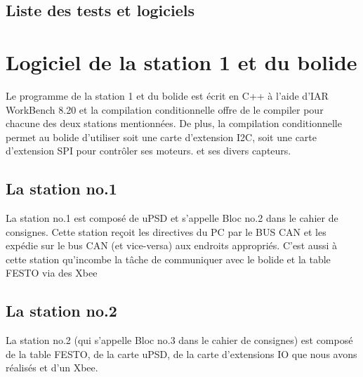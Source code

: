\documentclass[10pt,a4paper,final]{article}
\begin{document}
\begin{spacing}{1.5}
\subsection{Liste des tests et logiciels}






\pagebreak
\section{Logiciel de la station 1 et du bolide}
Le programme de la station 1 et du bolide est écrit en C++ à l'aide d'IAR WorkBench 8.20 et la compilation conditionnelle offre de le compiler pour chacune des deux stations mentionnées. De plus, la compilation conditionnelle permet au bolide d'utiliser soit une carte d'extension I2C, soit une carte d'extension SPI pour contrôler ses moteurs. et ses divers capteurs.

\subsection{La station no.1}
La station no.1 est composé de uPSD et s'appelle Bloc no.2 dans le cahier de consignes. Cette station reçoit les directives du PC par le BUS CAN et les expédie sur le bus CAN (et vice-versa) aux endroits appropriés. C'est aussi à cette station qu'incombe la tâche de communiquer avec le bolide et la table FESTO via des Xbee

\subsection{La station no.2}
La station no.2 (qui s'appelle Bloc no.3 dans le cahier de consignes) est composé de la table FESTO, de la carte uPSD, de la carte d'extensions IO que nous avons réalisés et d'un Xbee.

\pagebreak
\begin{figure}[hbtp]

\end{figure}
\end{spacing}
\end{document}
